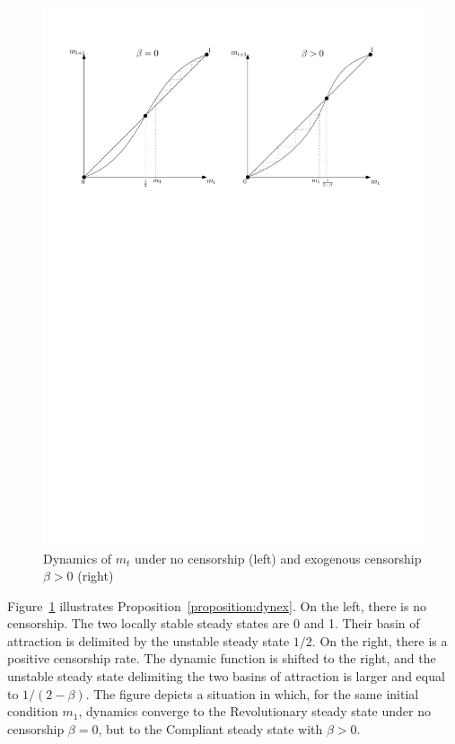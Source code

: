 \begin{figure}
\begin{center}
\includegraphics[width=15cm]{dynamics-m.pdf}
\end{center}
\caption{Dynamics of $m_t$ under no censorship (left) and exogenous censorship $\beta>0$ (right)}\label{fig:dynamics}
\end{figure}

Figure~\ref{fig:dynamics} illustrates Proposition~\ref{proposition:dynex}. On the left, there is no censorship. The two locally stable steady states are 0 and 1. Their basin of attraction is delimited by the unstable steady state $1/2$. On the right, there is a positive censorship rate. The dynamic function is shifted to the right, and the unstable steady state delimiting the two basins of attraction is larger and equal to $1/(2-\beta)$. The figure depicts a situation in which, for the same initial condition $m_1$, dynamics converge to the Revolutionary steady state under no censorship $\beta=0$, but to the Compliant steady state with $\beta>0$.

